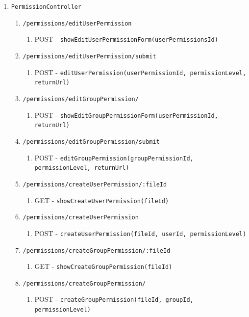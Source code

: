 \documentclass[12pt,DIV14,BCOR10mm,a4paper,parskip=half-,headsepline,headinclude,english,ngerman,bibliography=totocnumbered]{scrreprt}
\begin{document}
\begin{enumerate}
\begin{enumerate}
    \item \texttt{PermissionController}
    \begin{enumerate}

      \item \texttt{/permissions/editUserPermission}
      \begin{enumerate}
        \item POST - \texttt{showEditUserPermissionForm(userPermissionsId)}
      \end{enumerate}
      \item \texttt{/permissions/editUserPermission/submit}
      \begin{enumerate}
        \item POST - \texttt{editUserPermission(userPermissionId, permissionLevel, returnUrl)}
      \end{enumerate}
      \item \texttt{/permissions/editGroupPermission/}
      \begin{enumerate}
        \item POST - \texttt{showEditGroupPermissionForm(userPermissionId, returnUrl)}
      \end{enumerate}
      \item \texttt{/permissions/editGroupPermission/submit}
      \begin{enumerate}
        \item POST - \texttt{editGroupPermission(groupPermissionId, permissionLevel, returnUrl)}
      \end{enumerate}

      \item \texttt{/permissions/createUserPermission/:fileId}
      \begin{enumerate}
        \item GET - \texttt{showCreateUserPermission(fileId)}
      \end{enumerate}
      \item \texttt{/permissions/createUserPermission}
      \begin{enumerate}
        \item POST - \texttt{createUserPermission(fileId, userId, permissionLevel)}
      \end{enumerate}
      \item \texttt{/permissions/createGroupPermission/:fileId}
      \begin{enumerate}
        \item GET - \texttt{showCreateGroupPermission(fileId)}
      \end{enumerate}
      \item \texttt{/permissions/createGroupPermission/}
      \begin{enumerate}
        \item POST - \texttt{createGroupPermission(fileId, groupId, permissionLevel)}
      \end{enumerate}


\end{enumerate}
\end{enumerate}
\end{enumerate}
\end{document}
